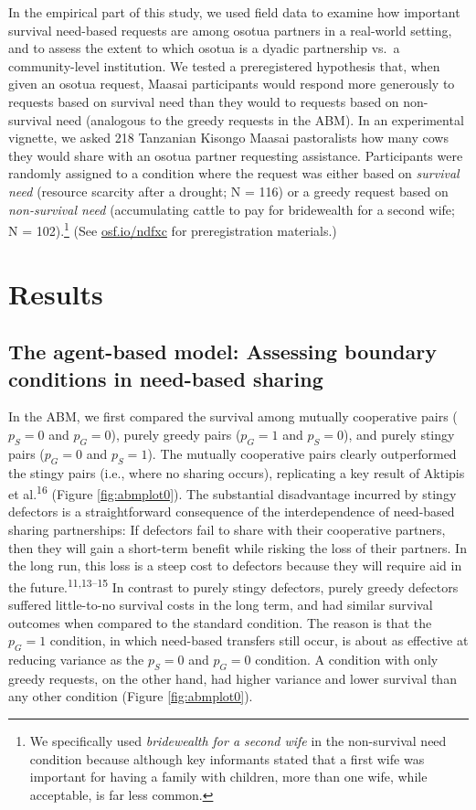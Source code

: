 \documentclass[
]{article}
\begin{document}
In the empirical part of this study, we used field data to examine how important survival need-based requests are among osotua partners in a real-world setting, and to assess the extent to which osotua is a dyadic partnership vs.~a community-level institution. We tested a preregistered hypothesis that, when given an osotua request, Maasai participants would respond more generously to requests based on survival need than they would to requests based on non-survival need (analogous to the greedy requests in the ABM). In an experimental vignette, we asked 218 Tanzanian Kisongo Maasai pastoralists how many cows they would share with an osotua partner requesting assistance. Participants were randomly assigned to a condition where the request was either based on \emph{survival need} (resource scarcity after a drought; N = 116) or a greedy request based on \emph{non-survival need} (accumulating cattle to pay for bridewealth for a second wife; N = 102).\footnote{We specifically used \emph{bridewealth for a second wife} in the non-survival need condition because although key informants stated that a first wife was important for having a family with children, more than one wife, while acceptable, is far less common.} (See \href{https://osf.io/ndfxc}{osf.io/ndfxc} for preregistration materials.)

\section*{Results}

\subsection*{The agent-based model: Assessing boundary conditions in need-based sharing}

In the ABM, we first compared the survival among mutually cooperative pairs (\(p_S=0\) and \(p_G=0\)), purely greedy pairs (\(p_G=1\) and \(p_S=0\)), and purely stingy pairs (\(p_G=0\) and \(p_S=1\)). The mutually cooperative pairs clearly outperformed the stingy pairs (i.e., where no sharing occurs), replicating a key result of Aktipis et al.\textsuperscript{16} (Figure \ref{fig:abmplot0}). The substantial disadvantage incurred by stingy defectors is a straightforward consequence of the interdependence of need-based sharing partnerships: If defectors fail to share with their cooperative partners, then they will gain a short-term benefit while risking the loss of their partners. In the long run, this loss is a steep cost to defectors because they will require aid in the future.\textsuperscript{11,13--15} In contrast to purely stingy defectors, purely greedy defectors suffered little-to-no survival costs in the long term, and had similar survival outcomes when compared to the standard condition. The reason is that the \(p_G=1\) condition, in which need-based transfers still occur, is about as effective at reducing variance as the \(p_S=0\) and \(p_G=0\) condition. A condition with only greedy requests, on the other hand, had higher variance and lower survival than any other condition (Figure \ref{fig:abmplot0}).
\end{document}
